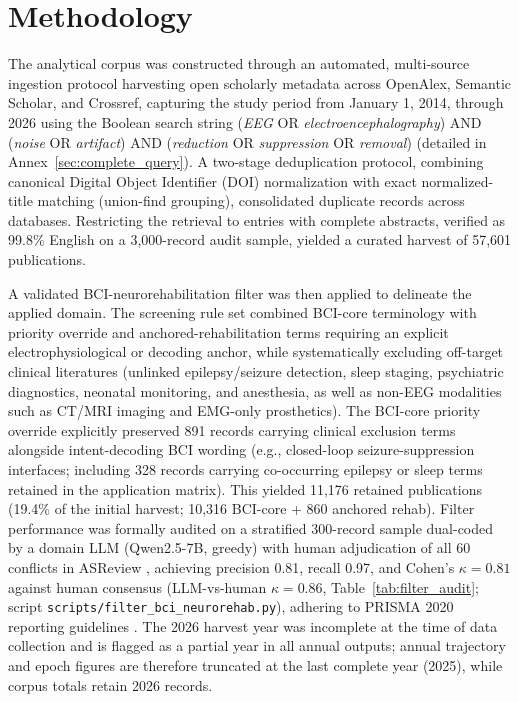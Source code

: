 \documentclass[preprint,12pt]{elsarticle}
\begin{document}
\section{Methodology}
\label{sec:methodology}
The analytical corpus was constructed through an automated, multi-source ingestion protocol harvesting open scholarly metadata across OpenAlex, Semantic Scholar, and Crossref, capturing the study period from January 1, 2014, through 2026 using the Boolean search string (\textit{EEG} OR \textit{electroencephalography}) AND (\textit{noise} OR \textit{artifact}) AND (\textit{reduction} OR \textit{suppression} OR \textit{removal}) (detailed in Annex~\ref{sec:complete_query}). A two-stage deduplication protocol, combining canonical Digital Object Identifier (DOI) normalization with exact normalized-title matching (union-find grouping), consolidated duplicate records across databases. Restricting the retrieval to entries with complete abstracts, verified as 99.8\% English on a 3,000-record audit sample, yielded a curated harvest of 57,601 publications. 

A validated BCI-neurorehabilitation filter was then applied to delineate the applied domain. The screening rule set combined BCI-core terminology with priority override and anchored-rehabilitation terms requiring an explicit electrophysiological or decoding anchor, while systematically excluding off-target clinical literatures (unlinked epilepsy/seizure detection, sleep staging, psychiatric diagnostics, neonatal monitoring, and anesthesia, as well as non-EEG modalities such as CT/MRI imaging and EMG-only prosthetics). The BCI-core priority override explicitly preserved 891 records carrying clinical exclusion terms alongside intent-decoding BCI wording (e.g., closed-loop seizure-suppression interfaces; including 328 records carrying co-occurring epilepsy or sleep terms retained in the application matrix). This yielded 11,176 retained publications (19.4\% of the initial harvest; 10,316 BCI-core + 860 anchored rehab). Filter performance was formally audited on a stratified 300-record sample dual-coded by a domain LLM (Qwen2.5-7B, greedy) with human adjudication of all 60 conflicts in ASReview \cite{vandeschoot2021open}, achieving precision 0.81, recall 0.97, and Cohen's $\kappa = 0.81$ against human consensus (LLM-vs-human $\kappa = 0.86$, Table~\ref{tab:filter_audit}; script \nolinkurl{scripts/filter_bci_neurorehab.py}), adhering to PRISMA 2020 reporting guidelines \cite{page2021prisma}. The 2026 harvest year was incomplete at the time of data collection and is flagged as a partial year in all annual outputs; annual trajectory and epoch figures are therefore truncated at the last complete year (2025), while corpus totals retain 2026 records.
\end{document}
